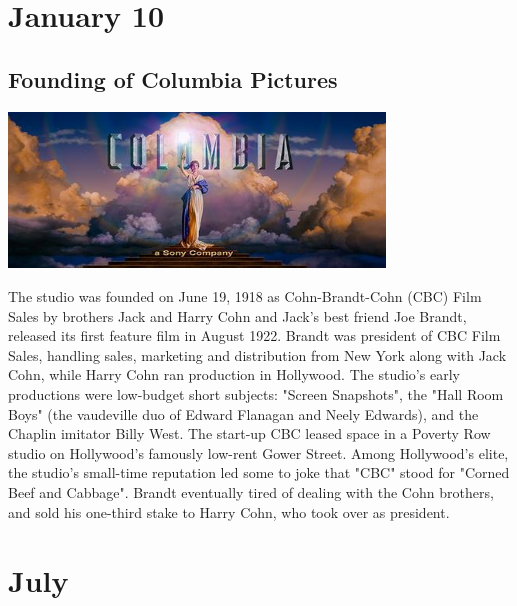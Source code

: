 \documentclass[11pt]{report}
\begin{document}
\section{January 10}
\subsection{Founding of Columbia Pictures}
\vspace{2mm}\begin{center}\includegraphics[width=10cm]{./img/columbiaPicLogo.jpg}\end{center}
The studio was founded on June 19, 1918 as Cohn-Brandt-Cohn (CBC) Film Sales by brothers Jack and Harry Cohn and Jack's best friend Joe Brandt, released its first feature film in August 1922. Brandt was president of CBC Film Sales, handling sales, marketing and distribution from New York along with Jack Cohn, while Harry Cohn ran production in Hollywood. The studio's early productions were low-budget short subjects: "Screen Snapshots", the "Hall Room Boys" (the vaudeville duo of Edward Flanagan and Neely Edwards), and the Chaplin imitator Billy West. The start-up CBC leased space in a Poverty Row studio on Hollywood's famously low-rent Gower Street. Among Hollywood's elite, the studio's small-time reputation led some to joke that "CBC" stood for "Corned Beef and Cabbage". Brandt eventually tired of dealing with the Cohn brothers, and sold his one-third stake to Harry Cohn, who took over as president.
\section{July}
\end{document}
